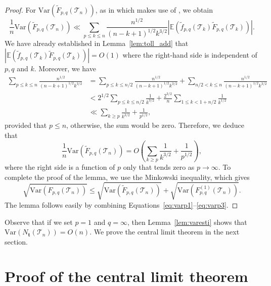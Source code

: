 \documentclass[article]{amsart}
\newcommand{\Var} {\mathrm {Var}}
\newcommand{\tc}{\mathcal{T}}
\newcommand{\st}{\textbf{t}}
\newcommand{\N}{N_{\st}}
\newcommand{\hf}{\tilde{f}_{p,q}}
\newcommand{\hF}{\tilde{F}_{p,q}}
\newcommand{\E}{\mathbb{E}}
\theoremstyle{definition}
\theoremstyle{remark}
\begin{document}
\begin{proof}
For $\Var(\hF(\tc_n))$, as in \cite[Equation (38)]{ralaivaosaona2020} which makes use of \cite[Equation (6.28)]{J16}, we obtain
\[
\frac{1}{n}\Var(\hF(\tc_n))\ll \sum_{p\le k\leq n}\frac{n^{1/2}}{(n-k+1)^{1/2}k^{3/2}}\left|\E(\hf(\tc_k)\hF(\tc_k))\right|.
\]
We have already established in Lemma~\ref{lem:toll_add} that $|\E(\hf(\tc_k)\hF(\tc_k))|=O(1)$ where the right-hand side is independent of $p,q$ and $k$. Moreover, we have  
\begin{align*}
\sum_{p\le k\leq n}\frac{n^{1/2}}{(n-k+1)^{1/2}k^{3/2}}
& = \sum_{p\leq k\leq n/2}\frac{n^{1/2}}{(n-k+1)^{1/2}k^{3/2}}+\sum_{ n/2<k\leq n}\frac{n^{1/2}}{(n-k+1)^{1/2}k^{3/2}}\\
& <  2^{1/2}\sum_{p\leq k\leq n/2}\frac{1}{k^{3/2}}+\frac{2^{3/2}}{n}\sum_{1\leq k<1+n/2}\frac{1}{k^{1/2}}\\
& \ll \sum_{k\geq p}\frac{1}{k^{3/2}}+\frac{1}{p^{1/2}},
\end{align*}
provided that $p\leq n$, otherwise, the sum would be zero. Therefore, we deduce that 
\begin{equation}\label{eq:varp3}
    \frac{1}{n}\Var(\hF(\tc_n))=O\left(\sum_{k\geq p}\frac{1}{k^{3/2}}+\frac{1}{p^{1/2}}\right),
\end{equation}
where the right side is a function of $p$ only that tends zero as $p\to\infty$. To complete the proof of the lemma, we use the Minkowski inequality, which gives
\[
\sqrt{\Var(F_{p,q}(\tc_n))}\leq \sqrt{\Var(\hF(\tc_n))}+\sqrt{\Var(F_{p,q}^{(1)}(\tc_n))}.
\]
The lemma follows easily by combining Equations~\eqref{eq:varp1}--\eqref{eq:varp3}. 
\end{proof}

Observe that if we set $p=1$ and $q=\infty$, then Lemma~\ref{lem:varesti} shows that $\Var(\N(\tc_n))=O(n)$. We prove the central limit theorem in the next section.

\section{Proof of the central limit theorem}
\end{document}
